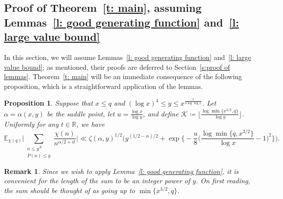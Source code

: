 \documentclass[a4paper,12pt,reqno]{amsart}
\newtheorem*{xremark}{Remark}
\newtheorem{proposition}{Proposition}
\newcommand{\R}{\mathbb{R}}
\newcommand{\E}{\mathbb{E}}
\begin{document}
\subsection{Proof of Theorem~\ref{t: main}, assuming Lemmas~\ref{l: good generating function} and~\ref{l: large value bound}}\label{s: Proof of main theorem}
In this section, we will assume Lemmas~\ref{l: good generating function} and~\ref{l: large value bound}; as mentioned, their proofs are deferred to Section~\ref{s:proof of lemmas}. Theorem~\ref{t: main} will be an immediate consequence of the following proposition, which is a straightforward application of the lemmas.
\begin{proposition}\label{p: L1 norm}
Suppose that $x \leq q$ and $(\log x)^4 \leq y \leq x^{\frac{1}{4 \log \log x}}$. Let $\alpha = \alpha (x,y)$ be the saddle point, let $u = \frac{\log x}{\log y}$, and define $\mathcal{K} \coloneqq \lfloor \frac{\log \min \{ x^{3/2}, q \}}{\log y} \rfloor$. Uniformly for any $t \in \R$, we have
\[
\E_{\chi (q)} \biggl| \sum_{\substack{n \leq y^{\mathcal{K}} \\ P(n) \leq y}} \frac{\chi(n)}{n^{\alpha / 2 + it}} \biggr| \ll \zeta (\alpha, y)^{1/2} \biggl(y^{(1/2 - \alpha)/2} + \exp \biggl\{ - \frac{u}{8} \biggl( \frac{\log \min\{ q, x^{3/2} \}}{\log x} - 1 \biggr)^2 \biggr\} \biggr).
\]
\end{proposition}

\begin{xremark}
\normalfont Since we wish to apply Lemma~\ref{l: good generating function}, it is convenient for the length of the sum to be an integer power of $y$. On first reading, the sum should be thought of as going up to $\min \{ x^{3/2}, q \}$.
\end{xremark}
\end{document}
